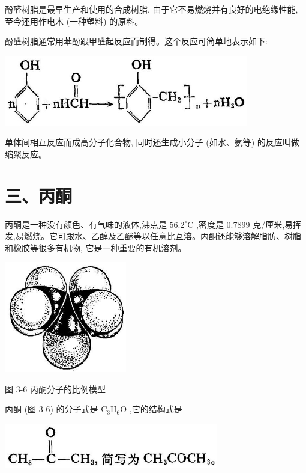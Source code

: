 \documentclass[10pt]{article}
\begin{document}
酚醛树脂是最早生产和使用的合成树脂, 由于它不易燃烧并有良好的电绝缘性能, 至今还用作电木 (一种塑料) 的原料。

酚醛树脂通常用苯酚跟甲醛起反应而制得。这个反应可简单地表示如下:

\begin{center}
\includegraphics[max width=0.8\textwidth]{images/01912d16-be99-77bb-9535-4f3ed8d9946f_130_844574.jpg}
\end{center}

单体间相互反应而成高分子化合物, 同时还生成小分子 (如水、氨等) 的反应叫做缩聚反应。

\section*{三、丙酮}

丙酮是一种没有颜色、有气味的液体,沸点是 \({56.2}^{ \circ }\mathrm{C}\) ,密度是 0.7899 克/厘米,易挥发,易燃烧。它可跟水、乙醇及乙醚等以任意比互溶。丙酮还能够溶解脂肪、树脂和橡胶等很多有机物, 它是一种重要的有机溶剂。

\begin{center}
\includegraphics[max width=0.4\textwidth]{images/01912d16-be99-77bb-9535-4f3ed8d9946f_131_871914.jpg}
\end{center}

图 3-6 丙酮分子的比例模型

丙酮 (图 3-6) 的分子式是 \({\mathrm{C}}_{3}{\mathrm{H}}_{6}\mathrm{O}\) ,它的结构式是

\begin{center}
\includegraphics[max width=0.7\textwidth]{images/01912d16-be99-77bb-9535-4f3ed8d9946f_131_193885.jpg}
\end{center}
\end{document}

